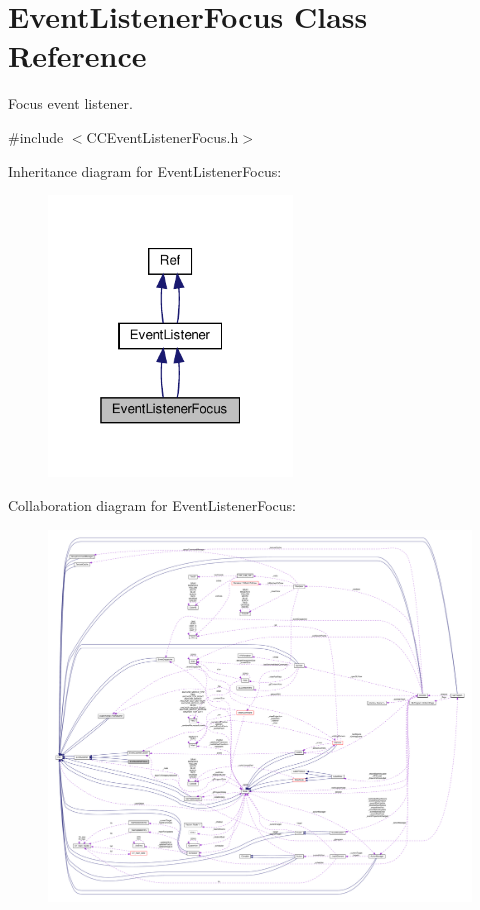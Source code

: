 \hypertarget{classEventListenerFocus}{}\section{Event\+Listener\+Focus Class Reference}
\label{classEventListenerFocus}


Focus event listener.  




{\ttfamily \#include $<$C\+C\+Event\+Listener\+Focus.\+h$>$}



Inheritance diagram for Event\+Listener\+Focus\+:
\nopagebreak
\begin{figure}[H]
\begin{center}
\leavevmode
\includegraphics[width=184pt]{classEventListenerFocus__inherit__graph}
\end{center}
\end{figure}


Collaboration diagram for Event\+Listener\+Focus\+:
\nopagebreak
\begin{figure}[H]
\begin{center}
\leavevmode
\includegraphics[width=350pt]{classEventListenerFocus__coll__graph}
\end{center}
\end{figure}

